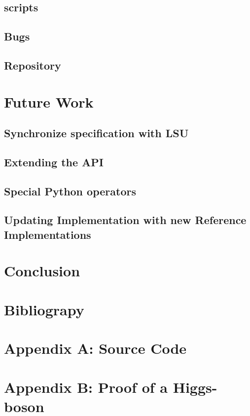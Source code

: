 \documentclass[a4paper,11pt,onecolumn,notitlepage]{report}
\begin{document}
\subsection{scripts}
\subsection{Bugs}
\subsection{Repository}
\pagebreak[0]

\section{Future Work}
\subsection{Synchronize specification with LSU}
\subsection{Extending the API}
\subsection{Special Python operators}
\subsection{Updating Implementation with new Reference Implementations}
\pagebreak[0]

\section{Conclusion}
\pagebreak[0]


\section{Bibliograpy}
\pagebreak[0]
\section{Appendix A: Source Code}
\section{Appendix B: Proof of a Higgs-boson}
\end{document}
